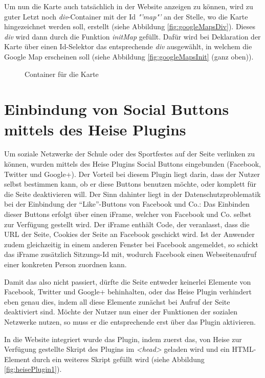 Um nun die Karte auch tatsächlich in der Website anzeigen zu können, wird zu guter Letzt noch \textit{div}-Container mit der Id \textit{"'map"'} an der Stelle, wo die Karte hingezeichnet werden soll, erstellt (siehe Abbildung \vref{fig:googleMapsDiv}). Dieses \textit{div} wird dann durch die Funktion \textit{initMap} gefüllt. Dafür wird bei Deklaration der Karte über einen Id-Selektor das entsprechende \textit{div} ausgewählt, in welchem die Google Map erscheinen soll (siehe Abbildung \vref{fig:googleMapsInit} (ganz oben)).

\begin{figure}[!bh]
	\caption{Container für die Karte}
	\label{fig:googleMapsDiv}
\end{figure}

\section{Einbindung von Social Buttons mittels des Heise Plugins}
\label{Einbindung von Social Buttons mittels des Heise Plugins}
Um soziale Netzwerke der Schule oder des Sportfestes auf der Seite verlinken zu können, wurden mittels des Heise Plugins Social Buttons eingebunden (Facebook, Twitter und Google+). Der Vorteil bei diesem Plugin liegt darin, dass der Nutzer selbst bestimmen kann, ob er diese Buttons benutzen möchte, oder komplett für die Seite deaktivieren will. Der Sinn dahinter liegt in der Datenschutzproblematik bei der Einbindung der "`Like"'-Buttons von Facebook und Co.: Das Einbinden dieser Buttons erfolgt über einen iFrame, welcher von Facebook und Co. selbst zur Verfügung gestellt wird. Der iFrame enthält Code, der veranlasst, dass die URL der Seite, Cookies der Seite an Facebook geschickt wird. Ist der Anwender zudem gleichzeitig in einem anderen Fenster bei Facebook angemeldet, so schickt das iFrame zusätzlich Sitzungs-Id mit, wodurch Facebook einen Webseitenaufruf einer konkreten Person zuordnen kann.
\par
Damit das also nicht passiert, dürfte die Seite entweder keinerlei Elemente von Facebook, Twitter und Google+ behinhalten, oder das Heise Plugin verhindert eben genau dies, indem all diese Elemente zunächst bei Aufruf der Seite deaktiviert sind. Möchte der Nutzer nun einer der Funktionen der sozialen Netzwerke nutzen, so muss er die entsprechende erst über das Plugin aktivieren.
\par
In die Website integriert wurde das Plugin, indem zuerst das, von Heise zur Verfügung gestellte Skript des Plugins im \textit{<head>} geladen wird und ein HTML-Element durch ein weiteres Skript gefüllt wird (siehe Abbildung \vref{fig:heisePlugin1}).

